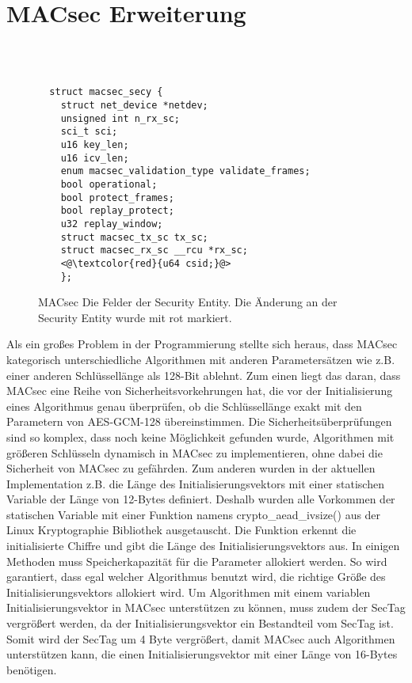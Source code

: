 \section{MACsec Erweiterung}
\\
\\
\begin{figure}
  \lstset{language=C}
  \begin{lstlisting}
  struct macsec_secy {
	struct net_device *netdev;
	unsigned int n_rx_sc;
	sci_t sci;
	u16 key_len;
	u16 icv_len;
	enum macsec_validation_type validate_frames;
	bool operational;
	bool protect_frames;
	bool replay_protect;
	u32 replay_window;
	struct macsec_tx_sc tx_sc;
	struct macsec_rx_sc __rcu *rx_sc;
	<@\textcolor{red}{u64 csid;}@>
	};
  \end{lstlisting}
  \caption[Abbildung der SecY]{\acrshort{MACsec} Die Felder der Security Entity. Die Änderung an der Security Entity wurde mit rot markiert.}
\label{lst:macsec_SecY}
\end{figure}Als ein großes Problem in der Programmierung stellte sich heraus, dass \gls{MACsec} kategorisch unterschiedliche Algorithmen mit anderen Parametersätzen wie z.B. einer anderen Schlüssellänge als 128-Bit ablehnt. Zum einen liegt das daran, dass MACsec eine Reihe von Sicherheitsvorkehrungen hat, die vor der Initialisierung eines Algorithmus genau überprüfen, ob die Schlüssellänge exakt mit den Parametern von \gls{AES-GCM}-128 übereinstimmen. Die Sicherheitsüberprüfungen sind so komplex, dass noch keine Möglichkeit gefunden wurde, Algorithmen mit größeren Schlüsseln dynamisch in MACsec zu implementieren, ohne dabei die Sicherheit von \gls{MACsec} zu gefährden. 
Zum anderen wurden in der aktuellen Implementation z.B. die Länge des Initialisierungsvektors mit einer statischen Variable der Länge von 12-Bytes definiert. Deshalb wurden alle Vorkommen der statischen Variable mit einer Funktion namens crypto\_aead\_ivsize() aus der Linux Kryptographie Bibliothek ausgetauscht. Die Funktion erkennt die initialisierte Chiffre und gibt die Länge des Initialisierungsvektors aus. In einigen Methoden muss Speicherkapazität für die Parameter allokiert werden. So wird garantiert, dass egal welcher Algorithmus benutzt wird, die richtige Größe des Initialisierungsvektors allokiert wird.
Um Algorithmen mit einem variablen Initialisierungsvektor in MACsec unterstützen zu können, muss zudem der SecTag vergrößert werden, da der Initialisierungsvektor ein Bestandteil vom SecTag ist. Somit wird der SecTag um 4 Byte vergrößert, damit \gls{MACsec} auch Algorithmen unterstützen kann, die einen Initialisierungsvektor mit einer Länge von 16-Bytes benötigen.
